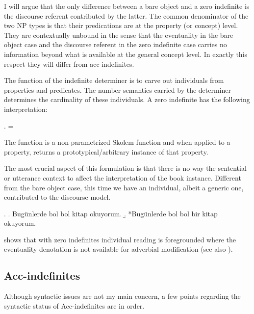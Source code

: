 \documentclass[11pt,a4paper]{article}
\begin{document}
I will argue that the only difference between a bare object and a zero indefinite is the discourse referent contributed by the latter. The common denominator of the two NP types is that their predications are at the property (or concept) level. They are contextually unbound in the sense that the eventuality in the bare object case and the discourse referent in the zero indefinite case carries no information beyond what is available at the general concept level. In exactly this respect they will differ from acc-indefinites.


The function of the indefinite determiner is to carve out individuals from properties and predicates. The number semantics carried by the determiner determines the cardinality of these individuals. A zero indefinite has the following interpretation:

\ex.
 =

The function  is a non-parametrized Skolem function and when applied to a property, returns a prototypical/arbitrary instance of that property.

The most crucial aspect of this formulation is that there is no way the sentential or utterance context to affect the interpretation of the book instance. Different from the bare object case, this time we have an individual, albeit a generic one, contributed to the discourse model.

\ex.\label{exbolbol}
\a. Bugünlerde bol bol kitap okuyorum.
\b. *Bugünlerde bol bol bir kitap okuyorum.

 shows that with zero indefinites individual reading is foregrounded where the eventuality denotation is not available for adverbial modification (see also ).



\subsection{Acc-indefinites}

Although syntactic issues are not my main concern, a few points regarding the syntactic status of Acc-indefinites are in order.
\end{document}

